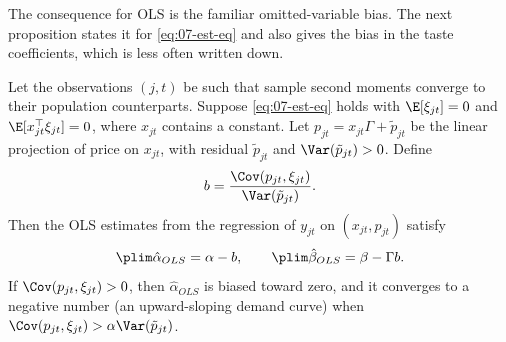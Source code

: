 The consequence for OLS is the familiar omitted-variable bias. The next proposition states it for
\eqref{eq:07-est-eq} and also gives the bias in the taste coefficients, which is less often written down.

\begin{proposition}\label{prop:07-ols-bias}
Let the observations $(j, t)$ be such that sample second moments converge to their population counterparts. Suppose
\eqref{eq:07-est-eq} holds with $\E[\xi_{jt}] = 0$ and $\E[x_{jt}^\top \xi_{jt}] = 0$, where $x_{jt}$ contains a
constant. Let $p_{jt} = x_{jt}\Gamma + \tilde p_{jt}$ be the linear projection of price on $x_{jt}$, with residual
$\tilde p_{jt}$ and $\Var(\tilde p_{jt}) > 0$. Define
\begin{equation*}
  b = \frac{\Cov(p_{jt}, \xi_{jt})}{\Var(\tilde p_{jt})}.
\end{equation*}
Then the OLS estimates from the regression of $y_{jt}$ on $(x_{jt}, p_{jt})$ satisfy
\begin{equation}\label{eq:07-ols-bias}
  \plim \hat\alpha_{OLS} = \alpha - b, \qquad \plim \hat\beta_{OLS} = \beta - \Gamma b .
\end{equation}
If $\Cov(p_{jt}, \xi_{jt}) > 0$, then $\hat\alpha_{OLS}$ is biased toward zero, and it converges to a negative number
(an upward-sloping demand curve) when $\Cov(p_{jt}, \xi_{jt}) > \alpha\Var(\tilde p_{jt})$.
\end{proposition}

